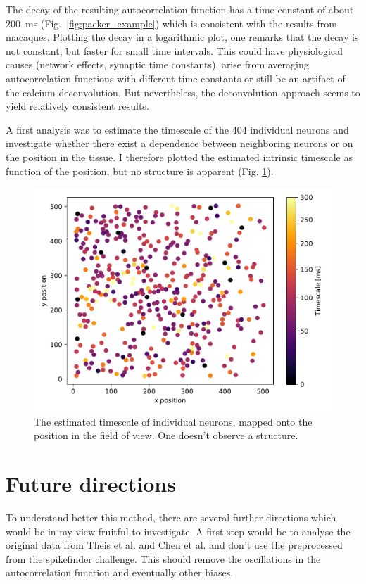 \documentclass[12pt,a4paper,headinclude]{scrartcl}
\begin{document}
The decay of the resulting autocorrelation function has a time constant of about \SI{200}{ms} (Fig.~\ref{fig:packer_example}) which is consistent with the results from macaques. Plotting the decay in a logarithmic plot, one remarks that the decay is not constant, but faster for small time intervals. This could have physiological causes (network effects, synaptic time constants), arise from averaging autocorrelation functions with different time constants  or still be an artifact of the calcium deconvolution. But nevertheless, the deconvolution approach seems to yield relatively consistent results.

A first analysis was to estimate the timescale of the 404 individual neurons and investigate whether there exist a dependence between neighboring neurons or on the position in the tissue. I therefore plotted the estimated intrinsic timescale as function of the position, but no structure is apparent (Fig. \ref{fig:packer_map_taus}).

\begin{figure}

	\centering
	\includegraphics[width=0.85\linewidth]{./figures/map_taus.pdf}
	
	\caption{The estimated timescale of individual neurons, mapped onto the position in the field of view. One doesn't observe a structure.}
	\label{fig:packer_map_taus}
\end{figure} 


\section{Future directions}

To understand better this method, there are several further directions which would be in my view fruitful to investigate. A first step would be to analyse the original data from Theis et al. and Chen et al. and don't use the preprocessed from the spikefinder challenge. This should remove the oscillations in the autocorrelation function and eventually other biases.
\end{document}
